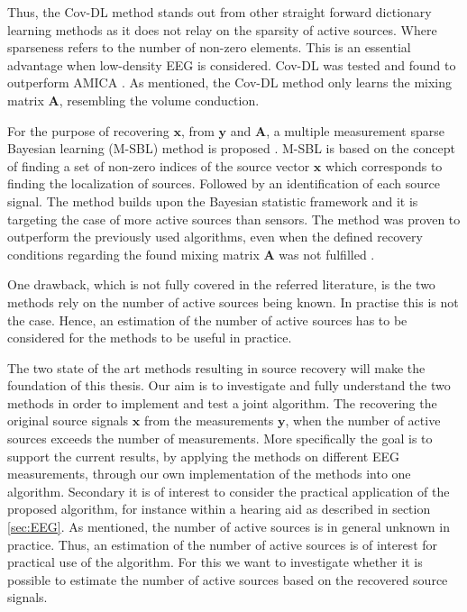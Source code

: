 Thus, the Cov-DL method stands out from other straight forward dictionary learning methods as it does not relay on the sparsity of active sources. Where sparseness refers to the number of non-zero elements. This is an essential advantage when low-density EEG is considered. 
Cov-DL was tested and found to outperform AMICA \cite{Balkan2015}. 
As mentioned, the Cov-DL method only learns the mixing matrix $\mathbf{A}$, resembling the volume conduction.

For the purpose of recovering $\mathbf{x}$, from $\mathbf{y}$ and $\mathbf{A}$, a multiple measurement sparse Bayesian learning (M-SBL) method is proposed \cite{Balkan2014}. M-SBL is based on the concept of finding a set of non-zero indices of the source vector $\mathbf{x}$ which corresponds to finding the localization of sources. Followed by an identification of each source signal. The method builds upon the Bayesian statistic framework and it is targeting the case of more active sources than sensors.
The method was proven to outperform the previously used algorithms, even when the defined recovery conditions regarding the found mixing matrix $\mathbf{A}$ was not fulfilled \cite{Balkan2014}.

One drawback, which is not fully covered in the referred literature, is the two methods rely on the number of active sources being known. 
In practise this is not the case. 
Hence, an estimation of the number of active sources has to be considered for the methods to be useful in practice.

The two state of the art methods resulting in source recovery will make the foundation of this thesis. 
Our aim is to investigate and fully understand the two methods in order to implement and test a joint algorithm. The recovering the original source signals $\mathbf{x}$ from the measurements $\mathbf{y}$, when the number of active sources exceeds the number of measurements. More specifically the goal is to support the current results, by applying the methods on different EEG measurements, through our own implementation of the methods into one algorithm. 
Secondary it is of interest to consider the practical application of the proposed algorithm, for instance within a hearing aid as described in section \ref{sec:EEG}. 
As mentioned, the number of active sources is in general unknown in practice.
Thus, an estimation of the number of active sources is of interest for practical use of the algorithm. 
For this we want to investigate whether it is possible to estimate the number of active sources based on the recovered source signals. 

